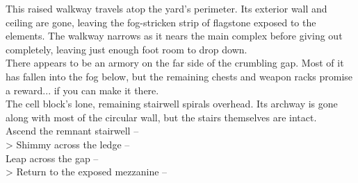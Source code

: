 This raised walkway travels atop the yard's perimeter. Its exterior wall and ceiling are gone, leaving the fog-stricken strip of flagstone exposed to the elements. The walkway narrows as it nears the main complex before giving out completely, leaving just enough foot room to drop down.\\

There appears to be an armory on the far side of the crumbling gap. Most of it has fallen into the fog below, but the remaining chests and weapon racks promise a reward... if you can make it there.\\

The cell block's lone, remaining stairwell spirals overhead. Its archway is gone along with most of the circular wall, but the stairs themselves are intact.\\

 Ascend the remnant stairwell -- \\
> Shimmy across the ledge -- \\
 Leap across the gap -- \\
> Return to the exposed mezzanine -- 